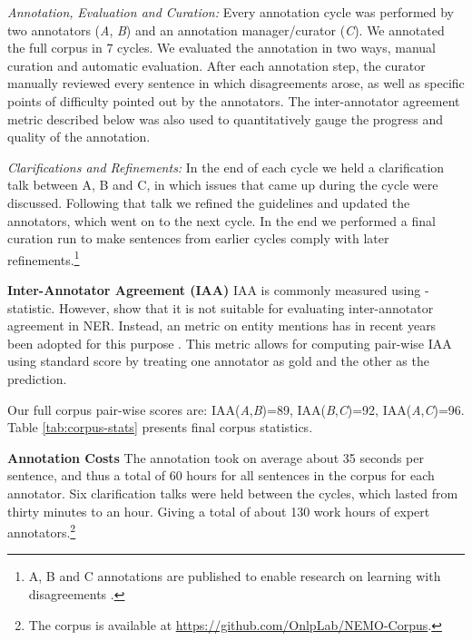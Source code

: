 \documentclass[11pt,a4paper]{article}
\begin{document}
{\em Annotation,} {\em Evaluation and Curation:} 
Every annotation cycle was performed by two annotators (\emph{A}, \emph{B}) and an annotation manager/curator (\emph{C}). We annotated the full corpus in 7 cycles.
 We evaluated the annotation  in two ways, manual curation and automatic evaluation.
After each annotation step, the curator manually reviewed every sentence in which disagreements arose, as well as specific points of difficulty pointed out by the annotators. The inter-annotator agreement metric described  below was also used to quantitatively gauge the progress and quality of the annotation.

{\em Clarifications and Refinements:} In the end of each cycle we held a clarification talk between A, B and C, 
in which issues that came up during the cycle were discussed.
Following that talk we refined the guidelines and updated the annotators, which went on to the next cycle. 
In the end we performed a final curation run to make sentences from earlier cycles comply with later refinements.\footnote{A, B and C annotations are published to enable research on learning with disagreements \cite{plank-etal-2014-learning}.}

{\bf Inter-Annotator Agreement (IAA)}
\label{subsec:iaa}
IAA is commonly measured using  -statistic. However, \citet{pyysalo2007bioinfer} show that it is not suitable for evaluating inter-annotator agreement in NER. Instead, an  metric on entity mentions has  in recent years been adopted for this purpose \cite{zhang2013named}. 
This metric allows for computing pair-wise IAA using standard  score
by treating one annotator as gold and the other as the prediction.

Our full corpus pair-wise  scores are: IAA(\emph{A},\emph{B})=89, IAA(\emph{B},\emph{C})=92, IAA(\emph{A},\emph{C})=96. Table \ref{tab:corpus-stats} presents final corpus statistics.

{\bf Annotation Costs} The annotation took on average about 35 seconds per sentence, and thus a total of 60 hours for all sentences in the corpus for each annotator. Six clarification talks were held between the cycles, which lasted from thirty minutes to an hour. Giving a total of about 130 work hours of expert annotators.\footnote{The corpus is available at \scriptsize{\url{https://github.com/OnlpLab/NEMO-Corpus}}.}  
\label{subsec:costs}
\end{document}
